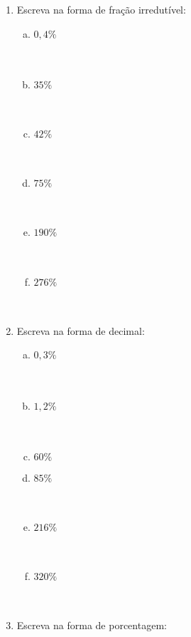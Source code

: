 \documentclass[a4paper,14pt]{article}
\begin{document}
\begin{multicols}{2}
\begin{enumerate}
			\item Escreva na forma de fração irredutível:
			\begin{enumerate}[a)] 
				\item $0,4\%$ \\\\\\
				\item $35\%$ \\\\\\
				\item $42\%$ \\\\\\
				\item $75\%$ \\\\\\
				\item $190\%$ \\\\\\
				\item $276\%$ \\\\\\
			\end{enumerate}
			\item Escreva na forma de decimal:
			\begin{enumerate}[a)] 
				\item $0,3\%$ \\\\\\
				\item $1,2\%$ \\\\\\
				\item $60\%$ \\
				\item $85\%$ \\\\\\
				\item $216\%$ \\\\\\
				\item $320\%$ \\\\\\
			\end{enumerate}
			\item Escreva na forma de porcentagem:

\end{enumerate}
\end{multicols}
\end{document}
